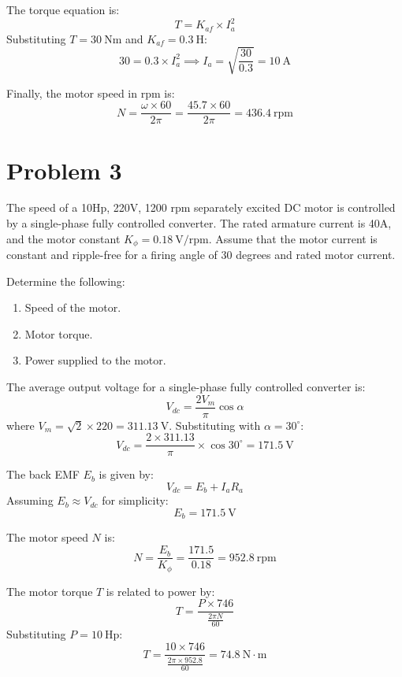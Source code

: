 \documentclass[12pt]{article}
\begin{document}
	\noindent The torque equation is:
	\[T = K_{af} \times I_a^2\]
	Substituting \(T = 30\ \text{Nm}\) and \(K_{af} = 0.3\ \text{H}\):
	\[30 = 0.3 \times I_a^2 \implies I_a = \sqrt{\frac{30}{0.3}} = 10\ \text{A}\]
	
	\noindent Finally, the motor speed in rpm is:
	\[N = \frac{\omega \times 60}{2\pi} = \frac{45.7 \times 60}{2\pi} = 436.4\ \text{rpm}\]
	

	\newpage
	
	\section*{Problem 3}
	The speed of a 10Hp, 220V, 1200 rpm separately excited DC motor is controlled by a single-phase fully controlled converter. The rated armature current is 40A, and the motor constant $K_\phi = 0.18\ \text{V/rpm}$. Assume that the motor current is constant and ripple-free for a firing angle of 30 degrees and rated motor current.
	
	Determine the following:
	\begin{enumerate}
		\item Speed of the motor.
		\item Motor torque.
		\item Power supplied to the motor.
	\end{enumerate}
	
	\maketitle
	
	\noindent The average output voltage for a single-phase fully controlled converter is:
	\[
	V_{dc} = \frac{2V_m}{\pi} \cos \alpha
	\]
	where \( V_m = \sqrt{2} \times 220 = 311.13\ \text{V} \). Substituting with \( \alpha = 30^\circ \):
	\[
	V_{dc} = \frac{2 \times 311.13}{\pi} \times \cos 30^\circ = 171.5\ \text{V}
	\]
	
	\noindent The back EMF \( E_b \) is given by:
	\[
	V_{dc} = E_b + I_a R_a
	\]
	Assuming \( E_b \approx V_{dc} \) for simplicity:
	\[
	E_b = 171.5\ \text{V}
	\]
	
	\noindent The motor speed \( N \) is:
	\[
	N = \frac{E_b}{K_\phi} = \frac{171.5}{0.18} = 952.8\ \text{rpm}
	\]
	
	\noindent The motor torque \( T \) is related to power by:
	\[
	T = \frac{P \times 746}{\frac{2\pi N}{60}}
	\]
	Substituting \( P = 10\ \text{Hp} \):
	\[
	T = \frac{10 \times 746}{\frac{2\pi \times 952.8}{60}} = 74.8\ \text{N}\cdot\text{m}
	\]
	
\end{document}
